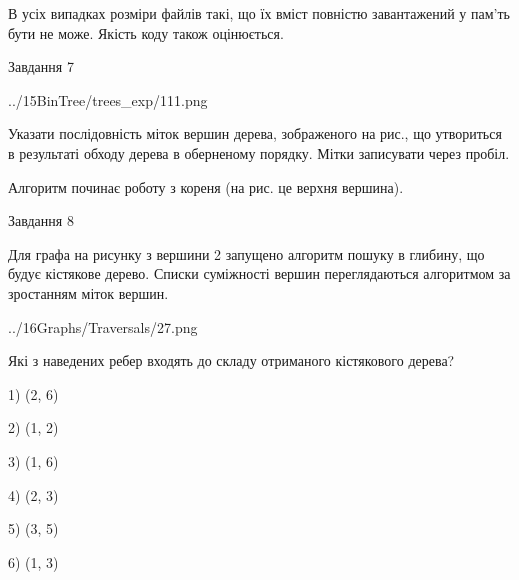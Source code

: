 \documentclass[12pt, ukrainian]{article}
\begin{document}
{В усіх випадках розміри файлів такі, що їх вміст повністю завантажений у пам'ть бути не може. Якість коду також оцінюється.



\vspace{10mm}\par

\newpage
\begin{minipage}[t]{9.7cm}
               
{\begin{center}Завдання {7}\end{center}}
\vspace{-4mm}

\begin{center}
	{../15BinTree/trees_exp/111.png}
\end{center}
Указати послідовність міток вершин дерева, зображеного на рис., що утвориться в результаті обходу дерева в оберненому порядку. Мітки записувати через пробіл.\par Алгоритм починає роботу з кореня (на рис. це верхня вершина).\par

\end{minipage}
\vline \hspace{8mm}
\begin{minipage}[t]{8.0cm}
               
{\begin{center}Завдання {8}\end{center}}
\vspace{-4mm}
Для графа на рисунку з вершини 2 запущено алгоритм пошуку в глибину, що будує кістякове дерево. Списки суміжності вершин переглядаються алгоритмом за зростанням міток вершин.\par
\begin{center}
	{../16Graphs/Traversals/27.png}
\end{center}
\par Які з наведених ребер входять до складу отриманого кістякового дерева?\par
1) (2, 6)\par
2) (1, 2)\par
3) (1, 6)\par
4) (2, 3)\par
5) (3, 5)\par
6) (1, 3)\par
{\vskip 15pt} \par


\end{minipage}}
\end{document}
